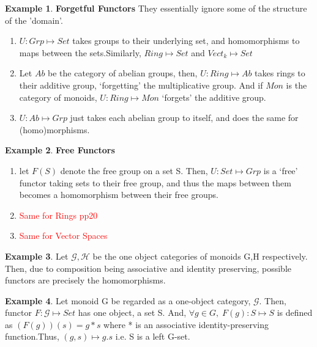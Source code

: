 \documentclass{article}
\theoremstyle{definition}
\newtheorem{example}{Example}[section]
\theoremstyle{definition}
\begin{document}
\begin{example}{\textbf{Forgetful Functors}} %
They essentially ignore some of the structure of the 'domain'.
\begin{enumerate}[label=(\alph*)]
		\item $ U:Grp\mapsto Set $ takes groups to their underlying set, and homomorphisms to maps between the sets.Similarly, $ Ring \mapsto Set $ and $ Vect_k \mapsto Set $
		\item Let $ Ab $ be the category of abelian groups, then,   $ U:Ring \mapsto Ab $ takes rings to their additive group, `forgetting' the multiplicative group. And if $ Mon $ is the category of monoids, $ U:Ring \mapsto Mon $ `forgets' the additive group.
		\item $ U:Ab \mapsto Grp $ just takes each abelian group to itself, and does the same for (homo)morphisms.
	\end{enumerate}
\end{example}
\begin{example}{\textbf{Free Functors}} %
	\begin{enumerate}[label=(\alph*)]
		\item let $ F(S) $ denote the free group on a set S. Then, $ U:Set \mapsto Grp $ is a `free' functor taking sets to their free group, and thus the maps between them becomes a homomorphism between their free groups.
		\item \textcolor{red}{Same for Rings pp20}
		\item \textcolor{red}{Same for Vector Spaces}
	\end{enumerate}
\end{example}
\begin{example}
	Let $ \mathcal{G}, \mathcal{H}$ be the one object categories of monoids G,H respectively. Then, due to composition being associative and identity preserving, possible functors are precisely the homomorphisms.
\end{example}
\begin{example}
	Let monoid G be regarded as a one-object category, $ \mathcal{G} $. Then, functor $ F:\mathcal{G} \mapsto Set $ has one object, a set S. And, $ \forall g \in G, \; F(g):S \mapsto S  $ is defined as $ (F(g))(s)=g*s$ where * is an associative identity-preserving function.Thus, $ (g,s) \mapsto g.s $ i.e. S is a left G-set.
\end{example}
\end{document}
